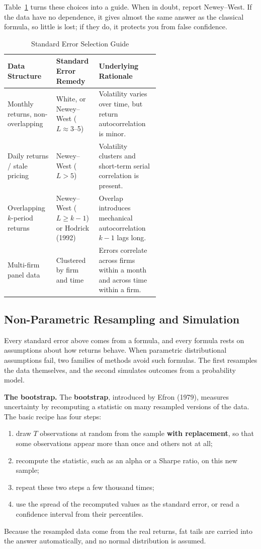 Table~\ref{tab:03-se-guide} turns these choices into a guide. When in doubt, report Newey--West. If the data have no dependence, it gives almost the same answer as the classical formula, so little is lost; if they do, it protects you from false confidence.

\begin{table}[htbp]
\centering
\small
\caption{Standard Error Selection Guide}
\label{tab:03-se-guide}
\begin{tabularx}{0.95\linewidth}{@{}>{\raggedright\arraybackslash}p{0.32\linewidth}>{\raggedright\arraybackslash}p{0.28\linewidth}>{\raggedright\arraybackslash}X@{}}
\toprule
Data Structure & Standard Error Remedy & Underlying Rationale \\
\midrule
Monthly returns, non-overlapping & White, or Newey--West ($L \approx 3$--5) & Volatility varies over time, but return autocorrelation is minor. \\
Daily returns / stale pricing & Newey--West ($L > 5$) & Volatility clusters and short-term serial correlation is present. \\
Overlapping $k$-period returns & Newey--West ($L \ge k-1$) or Hodrick (1992) & Overlap introduces mechanical autocorrelation $k-1$ lags long. \\
Multi-firm panel data & Clustered by firm and time & Errors correlate across firms within a month and across time within a firm. \\
\bottomrule
\end{tabularx}
\end{table}

\subsection{Non-Parametric Resampling and Simulation}
\label{sec:03-bootstrap}
Every standard error above comes from a formula, and every formula rests on assumptions about how returns behave. When parametric distributional assumptions fail, two families of methods avoid such formulas. The first resamples the data themselves, and the second simulates outcomes from a probability model.

\textbf{The bootstrap.} The \textbf{bootstrap}, introduced by Efron (1979), measures uncertainty by recomputing a statistic on many resampled versions of the data. The basic recipe has four steps:
\begin{enumerate}
  \item draw $T$ observations at random from the sample \textbf{with replacement}, so that some observations appear more than once and others not at all;
  \item recompute the statistic, such as an alpha or a Sharpe ratio, on this new sample;
  \item repeat these two steps a few thousand times;
  \item use the spread of the recomputed values as the standard error, or read a confidence interval from their percentiles.
\end{enumerate}
Because the resampled data come from the real returns, fat tails are carried into the answer automatically, and no normal distribution is assumed.

